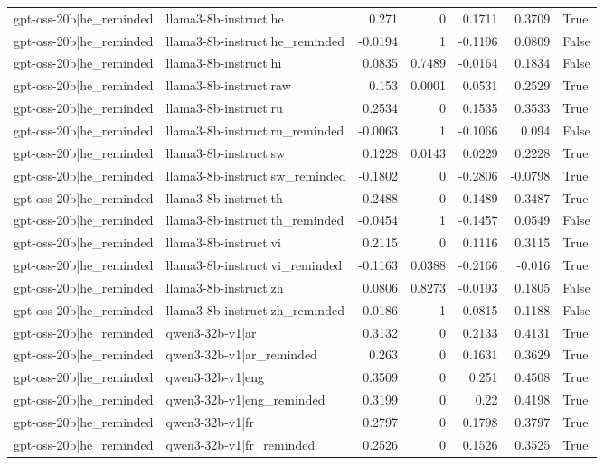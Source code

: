 \begin{table}
\begin{tabular}{l l r r r r l}
gpt-oss-20b|he_reminded & llama3-8b-instruct|he & 0.271 & 0 & 0.1711 & 0.3709 & True \\
gpt-oss-20b|he_reminded & llama3-8b-instruct|he_reminded & -0.0194 & 1 & -0.1196 & 0.0809 & False \\
gpt-oss-20b|he_reminded & llama3-8b-instruct|hi & 0.0835 & 0.7489 & -0.0164 & 0.1834 & False \\
gpt-oss-20b|he_reminded & llama3-8b-instruct|raw & 0.153 & 0.0001 & 0.0531 & 0.2529 & True \\
gpt-oss-20b|he_reminded & llama3-8b-instruct|ru & 0.2534 & 0 & 0.1535 & 0.3533 & True \\
gpt-oss-20b|he_reminded & llama3-8b-instruct|ru_reminded & -0.0063 & 1 & -0.1066 & 0.094 & False \\
gpt-oss-20b|he_reminded & llama3-8b-instruct|sw & 0.1228 & 0.0143 & 0.0229 & 0.2228 & True \\
gpt-oss-20b|he_reminded & llama3-8b-instruct|sw_reminded & -0.1802 & 0 & -0.2806 & -0.0798 & True \\
gpt-oss-20b|he_reminded & llama3-8b-instruct|th & 0.2488 & 0 & 0.1489 & 0.3487 & True \\
gpt-oss-20b|he_reminded & llama3-8b-instruct|th_reminded & -0.0454 & 1 & -0.1457 & 0.0549 & False \\
gpt-oss-20b|he_reminded & llama3-8b-instruct|vi & 0.2115 & 0 & 0.1116 & 0.3115 & True \\
gpt-oss-20b|he_reminded & llama3-8b-instruct|vi_reminded & -0.1163 & 0.0388 & -0.2166 & -0.016 & True \\
gpt-oss-20b|he_reminded & llama3-8b-instruct|zh & 0.0806 & 0.8273 & -0.0193 & 0.1805 & False \\
gpt-oss-20b|he_reminded & llama3-8b-instruct|zh_reminded & 0.0186 & 1 & -0.0815 & 0.1188 & False \\
gpt-oss-20b|he_reminded & qwen3-32b-v1|ar & 0.3132 & 0 & 0.2133 & 0.4131 & True \\
gpt-oss-20b|he_reminded & qwen3-32b-v1|ar_reminded & 0.263 & 0 & 0.1631 & 0.3629 & True \\
gpt-oss-20b|he_reminded & qwen3-32b-v1|eng & 0.3509 & 0 & 0.251 & 0.4508 & True \\
gpt-oss-20b|he_reminded & qwen3-32b-v1|eng_reminded & 0.3199 & 0 & 0.22 & 0.4198 & True \\
gpt-oss-20b|he_reminded & qwen3-32b-v1|fr & 0.2797 & 0 & 0.1798 & 0.3797 & True \\
gpt-oss-20b|he_reminded & qwen3-32b-v1|fr_reminded & 0.2526 & 0 & 0.1526 & 0.3525 & True \\

\end{tabular}
\end{table}
